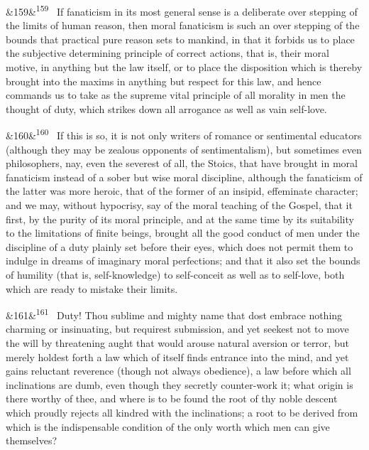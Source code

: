 \documentclass[12pt]{article}
\newcommand{\para}[1][]{\par\noindent\ifx&#1&\else\textsuperscript{\footnotesize #1}~\fi}
\begin{document}
\para[159] If fanaticism in its most general sense is a deliberate over stepping of the limits of human reason, then moral fanaticism is such an over stepping of the bounds that practical pure reason sets to mankind, in that it forbids us to place the subjective determining principle of correct actions, that is, their moral motive, in anything but the law itself, or to place the disposition which is thereby brought into the maxims in anything but respect for this law, and hence commands us to take as the supreme vital principle of all morality in men the thought of duty, which strikes down all arrogance as well as vain self-love.

\para[160] If this is so, it is not only writers of romance or sentimental educators (although they may be zealous opponents of sentimentalism), but sometimes even philosophers, nay, even the severest of all, the Stoics, that have brought in moral fanaticism instead of a sober but wise moral discipline, although the fanaticism of the latter was more heroic, that of the former of an insipid, effeminate character; and we may, without hypocrisy, say of the moral teaching of the Gospel, that it first, by the purity of its moral principle, and at the same time by its suitability to the limitations of finite beings, brought all the good conduct of men under the discipline of a duty plainly set before their eyes, which does not permit them to indulge in dreams of imaginary moral perfections; and that it also set the bounds of humility (that is, self-knowledge) to self-conceit as well as to self-love, both which are ready to mistake their limits.

\para[161] Duty! Thou sublime and mighty name that dost embrace nothing charming or insinuating, but requirest submission, and yet seekest not to move the will by threatening aught that would arouse natural aversion or terror, but merely holdest forth a law which of itself finds entrance into the mind, and yet gains reluctant reverence (though not always obedience), a law before which all inclinations are dumb, even though they secretly counter-work it; what origin is there worthy of thee, and where is to be found the root of thy noble descent which proudly rejects all kindred with the inclinations; a root to be derived from which is the indispensable condition of the only worth which men can give themselves?
\end{document}
